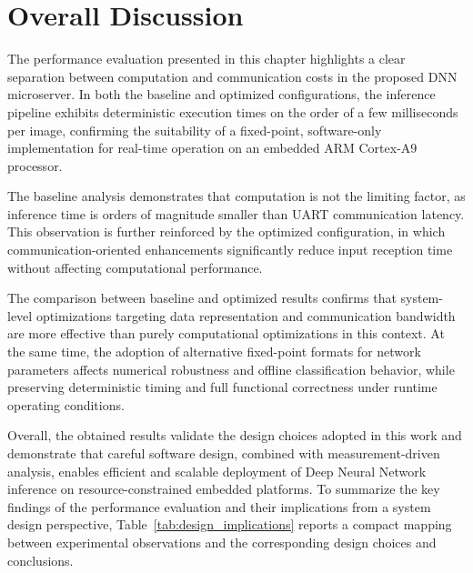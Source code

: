 \section{Overall Discussion}

The performance evaluation presented in this chapter highlights a clear
separation between computation and communication costs in the proposed DNN
microserver.
In both the baseline and optimized configurations, the inference pipeline
exhibits deterministic execution times on the order of a few milliseconds per
image, confirming the suitability of a fixed-point, software-only
implementation for real-time operation on an embedded ARM Cortex-A9 processor.

The baseline analysis demonstrates that computation is not the limiting factor,
as inference time is orders of magnitude smaller than UART communication
latency.
This observation is further reinforced by the optimized configuration, in which
communication-oriented enhancements significantly reduce input reception time
without affecting computational performance.

The comparison between baseline and optimized results confirms that
system-level optimizations targeting data representation and communication
bandwidth are more effective than purely computational optimizations in this
context.
At the same time, the adoption of alternative fixed-point formats for network
parameters affects numerical robustness and offline classification behavior,
while preserving deterministic timing and full functional correctness under
runtime operating conditions.

Overall, the obtained results validate the design choices adopted in this work
and demonstrate that careful software design, combined with
measurement-driven analysis, enables efficient and scalable deployment of Deep
Neural Network inference on resource-constrained embedded platforms.
To summarize the key findings of the performance evaluation and their
implications from a system design perspective,
Table~\ref{tab:design_implications} reports a compact mapping between
experimental observations and the corresponding design choices and conclusions.




